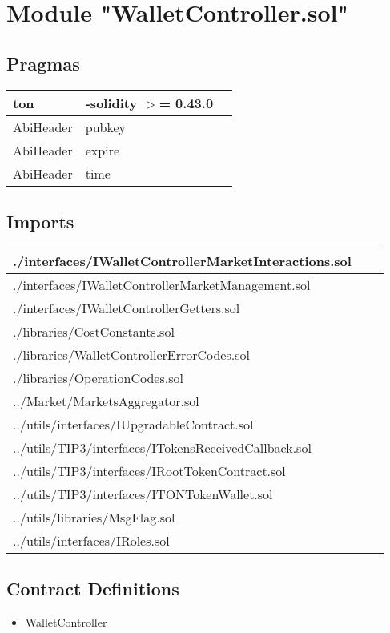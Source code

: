 
\section{Module "WalletController.sol"}


\subsection{Pragmas}


\noindent\begin{tabular}{|l|l|p{5cm}|}\hline
ton & -solidity $>$= 0.43.0 &\\\hline
AbiHeader &  pubkey &\\\hline
AbiHeader &  expire &\\\hline
AbiHeader &  time &\\\hline
\end{tabular}


\subsection{Imports}


\noindent\begin{tabular}{|l|l|p{5cm}|}\hline
./interfaces/IWalletControllerMarketInteractions.sol &\\\hline
./interfaces/IWalletControllerMarketManagement.sol &\\\hline
./interfaces/IWalletControllerGetters.sol &\\\hline
./libraries/CostConstants.sol &\\\hline
./libraries/WalletControllerErrorCodes.sol &\\\hline
./libraries/OperationCodes.sol &\\\hline
../Market/MarketsAggregator.sol &\\\hline
../utils/interfaces/IUpgradableContract.sol &\\\hline
../utils/TIP3/interfaces/ITokensReceivedCallback.sol &\\\hline
../utils/TIP3/interfaces/IRootTokenContract.sol &\\\hline
../utils/TIP3/interfaces/ITONTokenWallet.sol &\\\hline
../utils/libraries/MsgFlag.sol &\\\hline
../utils/interfaces/IRoles.sol &\\\hline
\end{tabular}


\subsection{Contract Definitions}

\begin{itemize}
\item WalletController
\end{itemize}

